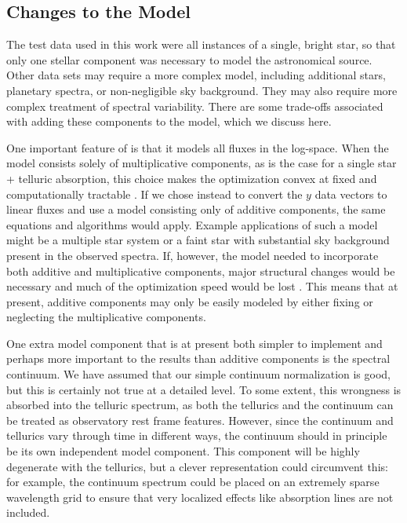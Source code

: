 \documentclass[modern]{aastex62}
\begin{document}
\subsection{Changes to the Model}
\label{s:model-changes}

The test data used in this work were all instances of a single, bright star, so that only one stellar component was necessary to model the astronomical source.
Other data sets may require a more complex model, including additional stars, planetary spectra, or non-negligible sky background.
They may also require more complex treatment of spectral variability.
There are some trade-offs associated with adding these components to the model, which we discuss here.

One important feature of \wobble is that it models all fluxes in the log-space.
When the model consists solely of multiplicative components, as is the case for a single star + telluric absorption, this choice makes the optimization convex at fixed \RV and computationally tractable .
If we chose instead to convert the $y$ data vectors to linear fluxes and use a model consisting only of additive components, the same equations and algorithms would apply.
Example applications of such a model might be a multiple star system or a faint star with substantial sky background present in the observed spectra.
If, however, the model needed to incorporate both additive and multiplicative
components, major structural changes would be necessary and much of the
optimization speed would be lost .
This means that at present, additive components may only be easily modeled by either fixing or neglecting the multiplicative components.

One extra model component that is at present both simpler to implement and perhaps more important to the results than additive components is the spectral continuum.
We have assumed that our simple continuum normalization is good, but this is certainly not true at a detailed level.
To some extent, this wrongness is absorbed into the telluric spectrum, as both the tellurics and the continuum can be treated as observatory rest frame features.
However, since the continuum and tellurics vary through time in different ways, the continuum should in principle be its own independent model component.
This component will be highly degenerate with the tellurics, but a clever representation could circumvent this: for example, the continuum spectrum could be placed on an extremely sparse wavelength grid to ensure that very localized effects like absorption lines are not included.
\end{document}
